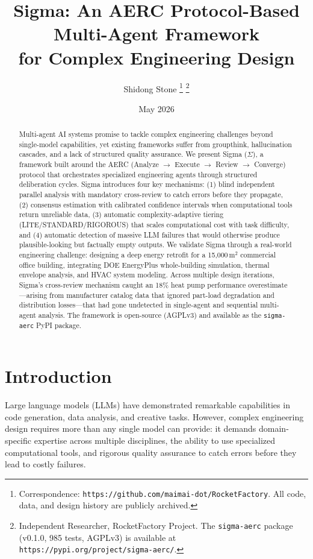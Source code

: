 \documentclass[11pt,a4paper]{article}
\title{\textbf{Sigma: An AERC Protocol-Based Multi-Agent Framework \\ for Complex Engineering Design}}
\author{Shidong Stone%
\thanks{Correspondence: \texttt{https://github.com/maimai-dot/RocketFactory}. All code, data, and design history are publicly archived.}%
\thanks{Independent Researcher, RocketFactory Project. The \texttt{sigma-aerc} package (v0.1.0, 985 tests, AGPLv3) is available at \texttt{https://pypi.org/project/sigma-aerc/}.}%
}
\date{May 2026}
\begin{document}
\maketitle

\begin{abstract}
Multi-agent AI systems promise to tackle complex engineering challenges beyond single-model capabilities, yet existing frameworks suffer from groupthink, hallucination cascades, and a lack of structured quality assurance. We present Sigma ($\Sigma$), a framework built around the AERC (Analyze $\rightarrow$ Execute $\rightarrow$ Review $\rightarrow$ Converge) protocol that orchestrates specialized engineering agents through structured deliberation cycles. Sigma introduces four key mechanisms: (1) blind independent parallel analysis with mandatory cross-review to catch errors before they propagate, (2) consensus estimation with calibrated confidence intervals when computational tools return unreliable data, (3) automatic complexity-adaptive tiering (LITE/STANDARD/RIGOROUS) that scales computational cost with task difficulty, and (4) automatic detection of massive LLM failures that would otherwise produce plausible-looking but factually empty outputs. We validate Sigma through a real-world engineering challenge: designing a deep energy retrofit for a 15{,}000\,m$^2$ commercial office building, integrating DOE EnergyPlus whole-building simulation, thermal envelope analysis, and HVAC system modeling. Across multiple design iterations, Sigma's cross-review mechanism caught an 18\% heat pump performance overestimate---arising from manufacturer catalog data that ignored part-load degradation and distribution losses---that had gone undetected in single-agent and sequential multi-agent analysis. The framework is open-source (AGPLv3) and available as the \texttt{sigma-aerc} PyPI package.
\end{abstract}

\section{Introduction}

Large language models (LLMs) have demonstrated remarkable capabilities in code generation, data analysis, and creative tasks. However, complex engineering design requires more than any single model can provide: it demands domain-specific expertise across multiple disciplines, the ability to use specialized computational tools, and rigorous quality assurance to catch errors before they lead to costly failures.
\end{document}

